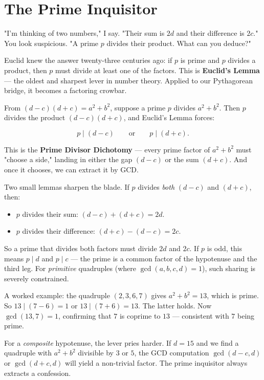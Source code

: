 \documentclass[11pt,openright,twoside]{book}
\theoremstyle{definition}
\begin{document}
\section{The Prime Inquisitor}

"I'm thinking of two numbers," I say. "Their sum is $2d$ and their difference is $2c$." You look suspicious. "A prime $p$ divides their product. What can you deduce?"

Euclid knew the answer twenty-three centuries ago: if $p$ is prime and $p$ divides a product, then $p$ must divide at least one of the factors. This is \textbf{Euclid's Lemma} --- the oldest and sharpest lever in number theory. Applied to our Pythagorean bridge, it becomes a factoring crowbar.

From $(d - c)(d + c) = a^2 + b^2$, suppose a prime $p$ divides $a^2 + b^2$. Then $p$ divides the product $(d - c)(d + c)$, and Euclid's Lemma forces:

\[p \mid (d - c) \qquad \text{or} \qquad p \mid (d + c).\]

This is the \textbf{Prime Divisor Dichotomy} --- every prime factor of $a^2 + b^2$ must "choose a side," landing in either the gap $(d - c)$ or the sum $(d + c)$. And once it chooses, we can extract it by GCD.

Two small lemmas sharpen the blade. If $p$ divides \textit{both} $(d - c)$ and $(d + c)$, then:

\begin{itemize}[leftmargin=*]
\item $p$ divides their sum: $(d - c) + (d + c) = 2d$.
\item $p$ divides their difference: $(d + c) - (d - c) = 2c$.
\end{itemize}

So a prime that divides both factors must divide $2d$ and $2c$. If $p$ is odd, this means $p \mid d$ and $p \mid c$ --- the prime is a common factor of the hypotenuse and the third leg. For \textit{primitive} quadruples (where $\gcd(a, b, c, d) = 1$), such sharing is severely constrained.

A worked example: the quadruple $(2, 3, 6, 7)$ gives $a^2 + b^2 = 13$, which is prime. So $13 \mid (7 - 6) = 1$ or $13 \mid (7 + 6) = 13$. The latter holds. Now $\gcd(13, 7) = 1$, confirming that $7$ is coprime to $13$ --- consistent with $7$ being prime.

For a \textit{composite} hypotenuse, the lever pries harder. If $d = 15$ and we find a quadruple with $a^2 + b^2$ divisible by $3$ or $5$, the GCD computation $\gcd(d - c, d)$ or $\gcd(d + c, d)$ will yield a non-trivial factor. The prime inquisitor always extracts a confession.
\end{document}
